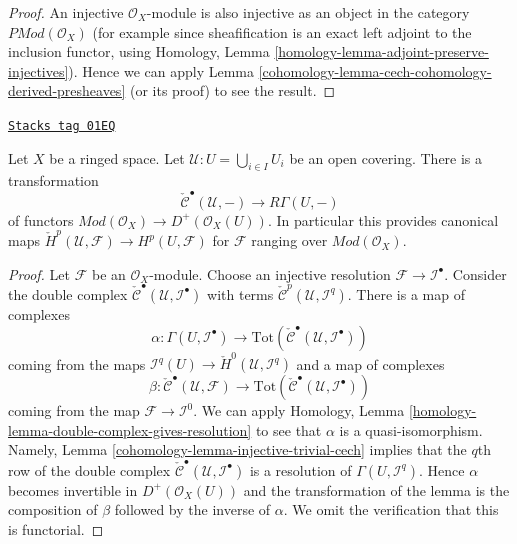 \begin{proof}

An injective $\mathcal{O}_X$-module is also injective as an object in
the category $\textit{PMod}(\mathcal{O}_X)$ (for example since
sheafification is an exact left adjoint to the inclusion functor,
using Homology, Lemma \ref{homology-lemma-adjoint-preserve-injectives}).
Hence we can apply Lemma \ref{cohomology-lemma-cech-cohomology-derived-presheaves}
(or its proof) to see the result.
\end{proof}

\begin{lemma}
\label{cohomology-lemma-cech-cohomology}
\href{https://stacks.math.columbia.edu/tag/01EQ}{\texttt{Stacks tag 01EQ}}

Let $X$ be a ringed space.
Let $\mathcal{U} : U = \bigcup_{i \in I} U_i$ be an open covering.
There is a transformation
$$
\check{\mathcal{C}}^\bullet(\mathcal{U}, -)
\longrightarrow
R\Gamma(U, -)
$$
of functors
$\textit{Mod}(\mathcal{O}_X) \to D^{+}(\mathcal{O}_X(U))$.
In particular this provides canonical maps
$\check{H}^p(\mathcal{U}, \mathcal{F}) \to H^p(U, \mathcal{F})$ for
$\mathcal{F}$ ranging over $\textit{Mod}(\mathcal{O}_X)$.
\end{lemma}

\begin{proof}

Let $\mathcal{F}$ be an $\mathcal{O}_X$-module. Choose an injective resolution
$\mathcal{F} \to \mathcal{I}^\bullet$. Consider the double complex
$\check{\mathcal{C}}^\bullet(\mathcal{U}, \mathcal{I}^\bullet)$ with terms
$\check{\mathcal{C}}^p(\mathcal{U}, \mathcal{I}^q)$.
There is a map of complexes
$$
\alpha :
\Gamma(U, \mathcal{I}^\bullet)
\longrightarrow
\text{Tot}(\check{\mathcal{C}}^\bullet(\mathcal{U}, \mathcal{I}^\bullet))
$$
coming from the maps
$\mathcal{I}^q(U) \to \check{H}^0(\mathcal{U}, \mathcal{I}^q)$
and a map of complexes
$$
\beta :
\check{\mathcal{C}}^\bullet(\mathcal{U}, \mathcal{F})
\longrightarrow
\text{Tot}(\check{\mathcal{C}}^\bullet(\mathcal{U}, \mathcal{I}^\bullet))
$$
coming from the map $\mathcal{F} \to \mathcal{I}^0$.
We can apply
Homology, Lemma \ref{homology-lemma-double-complex-gives-resolution}
to see that $\alpha$ is a quasi-isomorphism.
Namely, Lemma \ref{cohomology-lemma-injective-trivial-cech} implies that
the $q$th row of the double complex
$\check{\mathcal{C}}^\bullet(\mathcal{U}, \mathcal{I}^\bullet)$ is a
resolution of $\Gamma(U, \mathcal{I}^q)$.
Hence $\alpha$ becomes invertible in $D^{+}(\mathcal{O}_X(U))$ and
the transformation of the lemma is the composition of $\beta$
followed by the inverse of $\alpha$. We omit the verification
that this is functorial.
\end{proof}

